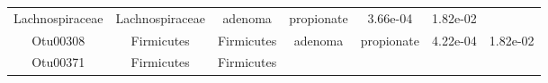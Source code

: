 \documentclass[11pt,]{article}
\begin{document}
\begin{longtable}[]{@{}ccccccc@{}}
\begin{minipage}[t]{0.17\columnwidth}
Lachnospiraceae\strut
\end{minipage} & \begin{minipage}[t]{0.17\columnwidth}\centering\strut
Lachnospiraceae\strut
\end{minipage} & \begin{minipage}[t]{0.09\columnwidth}\centering\strut
adenoma\strut
\end{minipage} & \begin{minipage}[t]{0.11\columnwidth}\centering\strut
propionate\strut
\end{minipage} & \begin{minipage}[t]{0.09\columnwidth}\centering\strut
3.66e-04\strut
\end{minipage} & \begin{minipage}[t]{0.09\columnwidth}\centering\strut
1.82e-02\strut
\end{minipage}\tabularnewline
\begin{minipage}[t]{0.09\columnwidth}\centering\strut
Otu00308\strut
\end{minipage} & \begin{minipage}[t]{0.17\columnwidth}\centering\strut
Firmicutes\strut
\end{minipage} & \begin{minipage}[t]{0.17\columnwidth}\centering\strut
Firmicutes\strut
\end{minipage} & \begin{minipage}[t]{0.09\columnwidth}\centering\strut
adenoma\strut
\end{minipage} & \begin{minipage}[t]{0.11\columnwidth}\centering\strut
propionate\strut
\end{minipage} & \begin{minipage}[t]{0.09\columnwidth}\centering\strut
4.22e-04\strut
\end{minipage} & \begin{minipage}[t]{0.09\columnwidth}\centering\strut
1.82e-02\strut
\end{minipage}\tabularnewline
\begin{minipage}[t]{0.09\columnwidth}\centering\strut
Otu00371\strut
\end{minipage} & \begin{minipage}[t]{0.17\columnwidth}\centering\strut
Firmicutes\strut
\end{minipage} & \begin{minipage}[t]{0.17\columnwidth}\centering\strut
Firmicutes\strut
\end{minipage} & \begin{minipage}[t]{0.09\columnwidth}\centering\strut

\end{minipage}
\end{longtable}
\end{document}
